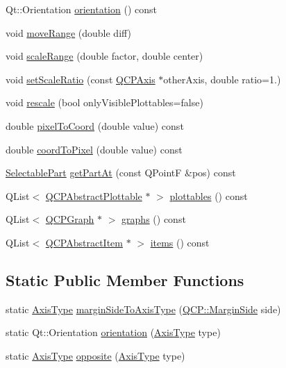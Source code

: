 \begin{DoxyCompactItemize}
\item 
Qt\+::\+Orientation \hyperlink{class_q_c_p_axis_a57483f2f60145ddc9e63f3af53959265}{orientation} () const 
\item 
void \hyperlink{class_q_c_p_axis_a18f3a68f2b691af1fd34b6593c886630}{move\+Range} (double diff)
\item 
void \hyperlink{class_q_c_p_axis_a7072ff96fe690148f1bbcdb4f773ea1c}{scale\+Range} (double factor, double center)
\item 
void \hyperlink{class_q_c_p_axis_af4bbd446dcaee5a83ac30ce9bcd6e125}{set\+Scale\+Ratio} (const \hyperlink{class_q_c_p_axis}{Q\+C\+P\+Axis} $\ast$other\+Axis, double ratio=1.)
\item 
void \hyperlink{class_q_c_p_axis_a499345f02ebce4b23d8ccec96e58daa9}{rescale} (bool only\+Visible\+Plottables=false)
\item 
double \hyperlink{class_q_c_p_axis_ae9289ef7043b9d966af88eaa95b037d1}{pixel\+To\+Coord} (double value) const 
\item 
double \hyperlink{class_q_c_p_axis_a985ae693b842fb0422b4390fe36d299a}{coord\+To\+Pixel} (double value) const 
\item 
\hyperlink{class_q_c_p_axis_abee4c7a54c468b1385dfce2c898b115f}{Selectable\+Part} \hyperlink{class_q_c_p_axis_ab2965a8ab1da948b897f1c006080760b}{get\+Part\+At} (const Q\+Point\+F \&pos) const 
\item 
Q\+List$<$ \hyperlink{class_q_c_p_abstract_plottable}{Q\+C\+P\+Abstract\+Plottable} $\ast$ $>$ \hyperlink{class_q_c_p_axis_a4f7404494cccdbfc00e1e865b7ed16a4}{plottables} () const 
\item 
Q\+List$<$ \hyperlink{class_q_c_p_graph}{Q\+C\+P\+Graph} $\ast$ $>$ \hyperlink{class_q_c_p_axis_ad3919e7d7400f55446ea82018fe5e3a8}{graphs} () const 
\item 
Q\+List$<$ \hyperlink{class_q_c_p_abstract_item}{Q\+C\+P\+Abstract\+Item} $\ast$ $>$ \hyperlink{class_q_c_p_axis_ae437656a5fd1a03721a8f2d7aab460fe}{items} () const 
\end{DoxyCompactItemize}
\subsection*{Static Public Member Functions}
\begin{DoxyCompactItemize}
\item 
static \hyperlink{class_q_c_p_axis_ae2bcc1728b382f10f064612b368bc18a}{Axis\+Type} \hyperlink{class_q_c_p_axis_ac0a6b77bd52bec6c81cd62d167cfeba6}{margin\+Side\+To\+Axis\+Type} (\hyperlink{namespace_q_c_p_a7e487e3e2ccb62ab7771065bab7cae54}{Q\+C\+P\+::\+Margin\+Side} side)
\item 
static Qt\+::\+Orientation \hyperlink{class_q_c_p_axis_a9a68b3e45f1b1e33d4d807822342516c}{orientation} (\hyperlink{class_q_c_p_axis_ae2bcc1728b382f10f064612b368bc18a}{Axis\+Type} type)
\item 
static \hyperlink{class_q_c_p_axis_ae2bcc1728b382f10f064612b368bc18a}{Axis\+Type} \hyperlink{class_q_c_p_axis_aa85ba73dfee6483e23825461b725e363}{opposite} (\hyperlink{class_q_c_p_axis_ae2bcc1728b382f10f064612b368bc18a}{Axis\+Type} type)
\end{DoxyCompactItemize}
